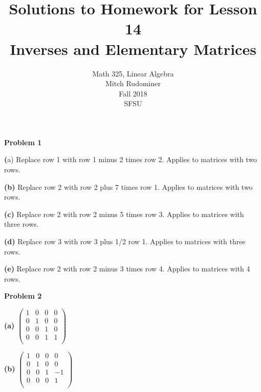 \documentclass[oneside,12pt]{amsart}
\begin{document}
\title{Solutions to Homework for Lesson 14 \\ Inverses and Elementary Matrices}
\author{Math 325, Linear Algebra \\ Mitch Rudominer \\ Fall 2018 \\ SFSU }
\date{}

\maketitle


\textbf{Problem 1}

\bigskip

\textbf(a) Replace row 1 with row 1 minus 2 times row 2. Applies to matrices
with two rows.

\bigskip

\textbf{(b)} Replace row 2 with row 2 plus 7 times row 1. Applies to matrices
with two rows.

\bigskip

\textbf{(c)} Replace row 2 with row 2 minus 5 times row 3. Applies to matrices
with three rows.

\bigskip

\textbf{(d)} Replace row 3 with row 3 plus 1/2 row 1. Applies to matrices
with three rows.

\bigskip

\textbf{(e)} Replace row 2 with row 2 minus 3 times row 4. Applies to
matrices with 4 rows.

\bigskip

\textbf{Problem 2}

\bigskip

\textbf{(a)}
$
\begin{pmatrix}
1 & 0 & 0 & 0 \\
0 & 1 & 0 & 0 \\
0 & 0 & 1 & 0 \\
0 & 0 & 1 & 1 \\
\end{pmatrix}
$

\bigskip

\textbf{(b)}
$
\begin{pmatrix}
1 & 0 & 0 & 0 \\
0 & 1 & 0 & 0 \\
0 & 0 & 1 & -1 \\
0 & 0 & 0 & 1 \\
\end{pmatrix}
$

\bigskip
\end{document}
